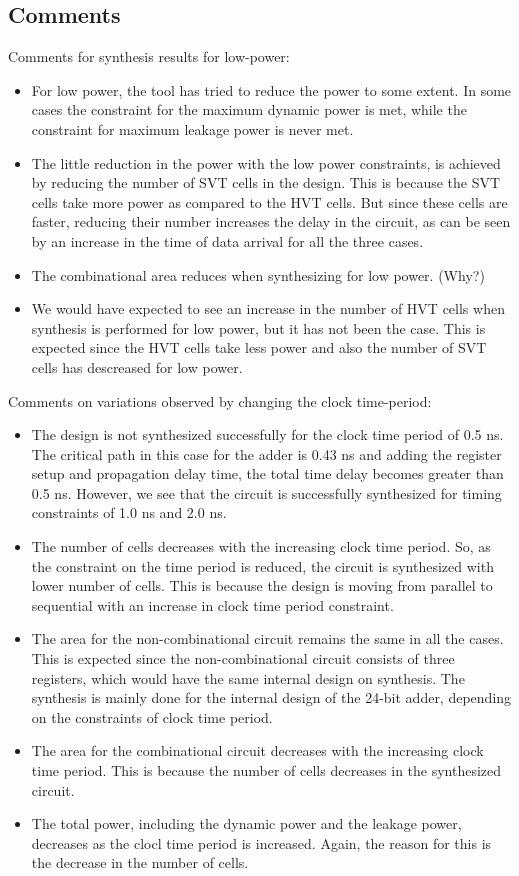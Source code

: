 \documentclass[11pt,a4paper]{article}
\begin{document}
\newpage
\subsection{Comments}
Comments for synthesis results for low-power:
\begin{itemize}
\item For low power, the tool has tried to reduce the power to some extent. In some cases the constraint for the maximum dynamic power is met, while the constraint for maximum leakage power is never met.
\item The little reduction in the power with the low power constraints, is achieved by reducing the number of SVT cells in the design. This is because the SVT cells take more power as compared to the HVT cells. But since these cells are faster, reducing their number increases the delay in the circuit, as can be seen by an increase in the time of data arrival for all the three cases.
\item The combinational area reduces when synthesizing for low power. (Why?)
\item We would have expected to see an increase in the number of HVT cells when synthesis is performed for low power, but it has not been the case. This is expected since the HVT cells take less power and also the number of SVT cells has descreased for low power.
\end{itemize}

\noindent Comments on variations observed by changing the clock time-period:
\begin{itemize}
\item The design is not synthesized successfully for the clock time period of 0.5 ns. The critical path in this case for the adder is 0.43 ns and adding the register setup and propagation delay time, the total time delay becomes greater than 0.5 ns. However, we see that the circuit is successfully synthesized for timing constraints of 1.0 ns and 2.0 ns.

\item The number of cells decreases with the increasing clock time period. So, as the constraint on the time period is reduced, the circuit is synthesized with lower number of cells. This is because the design is moving from parallel to sequential with an increase in clock time period constraint.

\item The area for the non-combinational circuit remains the same in all the cases. This is expected since the non-combinational circuit consists of three registers, which would have the same internal design on synthesis. The synthesis is mainly done for the internal design of the 24-bit adder, depending on the constraints of clock time period.

\item The area for the combinational circuit decreases with the increasing clock time period. This is because the number of cells decreases in the synthesized circuit.

\item The total power, including the dynamic power and the leakage power, decreases as the clocl time period is increased. Again, the reason for this is the decrease in the number of cells. 
\end{itemize}
\end{document}
